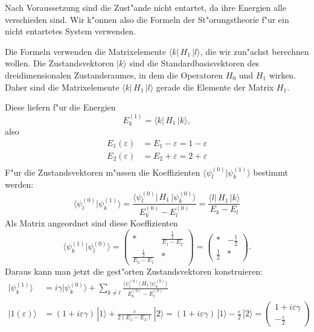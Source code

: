 \begin{loesung}
\begin{teilaufgaben}
\item
Nach Voraussetzung sind die Zust"ande nicht entartet, da ihre Energien
alle verschieden sind.
Wir k"onnen also die Formeln der St"orungstheorie f"ur ein nicht
entartetes System verwenden.

Die Formeln verwenden die
Matrixelemente $\langle k|\,H_1\,|l\rangle$,
die wir zun"achst berechnen wollen.
Die Zustandsvektoren $|k\rangle$ sind die Standardbasisvektoren
des dreidimensionalen Zustandsraumes, in dem die Operatoren $H_0$
und $H_1$ wirken.
Daher sind die Matrixelemente $\langle k|\,H_1\,|l\rangle$ gerade
die Elemente der Matrix $H_1$.

Diese liefern f"ur die
Energien
\[
E_k^{(1)}=\langle k|\, H_1\,|k\rangle,
\]
also 
\begin{align*}
E_1(\varepsilon)&=E_1-\varepsilon=1-\varepsilon\\
E_2(\varepsilon)&=E_2+\varepsilon=2+\varepsilon\\
\end{align*}
F"ur die Zustandsvektoren m"ussen die Koeffizienten 
$\langle\psi_l^{(0)}|\psi_k^{(1)}\rangle$ bestimmt werden:
\[
\langle\psi_l^{(0)}|\psi_k^{(1)}\rangle
=
\frac{\langle\psi_l^{(0)}|\,H_1\,|\psi_k^{(0)}\rangle}{E_k^{(0)}-E_l^{(0)}}
=
\frac{\langle l|\,H_1\,|k\rangle}{E_k-E_l}
\]
Als Matrix angeordnet sind diese Koeffizienten
\[
\langle\psi_k^{(1)}|\psi_l^{(0)}\rangle
=
\begin{pmatrix}
*
	&\displaystyle\frac{\frac12}{E_1-E_2}\\
\displaystyle\frac{\frac12}{E_2-E_1}
	&*
\end{pmatrix}
=
\begin{pmatrix}
*
	&\displaystyle-\frac12\\
\displaystyle\frac12
	&*
\end{pmatrix}.
\]
Daraus kann man jetzt die gest"orten Zustandsvektoren konstruieren:
\begin{align*}
|\psi_k^{(1)}\rangle
&=
i\gamma|\psi_k^{(0)}\rangle
+\sum_{k\ne l}\frac{\langle\psi_l^{(0)}|\,H_1\,|\psi_k^{(0)}\rangle}{E_k^{(0)}-E_l^{(0)}}
\\
|1(\varepsilon)\rangle
&=
(1+i\varepsilon\gamma)\,|1\rangle
	+ \frac{\varepsilon}{2(E_1-E_2)}\,|2\rangle 
=
(1+i\varepsilon\gamma)\,|1\rangle
	- \frac{\varepsilon}{2}\,|2\rangle 
=
\begin{pmatrix}
1+i\varepsilon\gamma \\ \displaystyle-\frac{\varepsilon}2

\end{pmatrix}
\end{align*}
\end{teilaufgaben}
\end{loesung}
